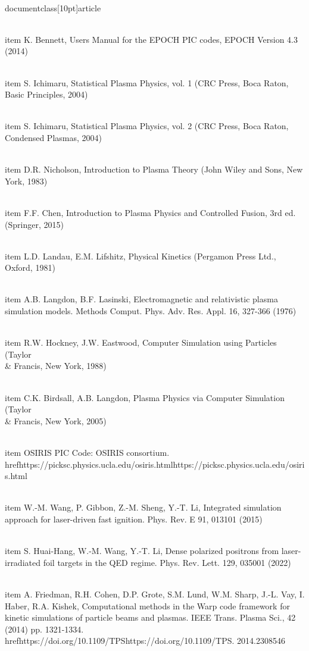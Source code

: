 \\documentclass[10pt]{article}
\begin{document}
  \\item K. Bennett, Users Manual for the EPOCH PIC codes, EPOCH Version 4.3 (2014)

  \\item S. Ichimaru, Statistical Plasma Physics, vol. 1 (CRC Press, Boca Raton, Basic Principles, 2004)

  \\item S. Ichimaru, Statistical Plasma Physics, vol. 2 (CRC Press, Boca Raton, Condensed Plasmas, 2004)

  \\item D.R. Nicholson, Introduction to Plasma Theory (John Wiley and Sons, New York, 1983)

  \\item F.F. Chen, Introduction to Plasma Physics and Controlled Fusion, 3rd ed. (Springer, 2015)

  \\item L.D. Landau, E.M. Lifshitz, Physical Kinetics (Pergamon Press Ltd., Oxford, 1981)

  \\item A.B. Langdon, B.F. Lasinski, Electromagnetic and relativistic plasma simulation models. Methods Comput. Phys. Adv. Res. Appl. 16, 327-366 (1976)

  \\item R.W. Hockney, J.W. Eastwood, Computer Simulation using Particles (Taylor \\& Francis, New York, 1988)

  \\item C.K. Birdsall, A.B. Langdon, Plasma Physics via Computer Simulation (Taylor \\& Francis, New York, 2005)

  \\item OSIRIS PIC Code: OSIRIS consortium. \\href{https://picksc.physics.ucla.edu/osiris.html}{https://picksc.physics.ucla.edu/osiris.html}

  \\item W.-M. Wang, P. Gibbon, Z.-M. Sheng, Y.-T. Li, Integrated simulation approach for laser-driven fast ignition. Phys. Rev. E 91, 013101 (2015)

  \\item S. Huai-Hang, W.-M. Wang, Y.-T. Li, Dense polarized positrons from laser-irradiated foil targets in the QED regime. Phys. Rev. Lett. 129, 035001 (2022)

  \\item A. Friedman, R.H. Cohen, D.P. Grote, S.M. Lund, W.M. Sharp, J.-L. Vay, I. Haber, R.A. Kishek, Computational methods in the Warp code framework for kinetic simulations of particle beams and plasmas. IEEE Trans. Plasma Sci., 42 (2014) pp. 1321-1334. \\href{https://doi.org/10.1109/TPS}{https://doi.org/10.1109/TPS}. 2014.2308546
\end{document}
